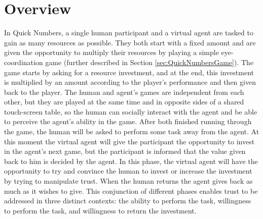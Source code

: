 \section{Overview}
\label{sec:ScenarioOverview}
In Quick Numbers, a single human participant and a virtual agent are tasked to gain as many resources as possible. They both start with a fixed amount and are given the opportunity to multiply their resources by playing a simple eye-coordination game (further described in Section \ref{sec:QuickNumbersGame}). The game starts by asking for a resource investment, and at the end, this investment is multiplied by an amount according to the player's performance and then given back to the player. The human and agent's games are independent from each other, but they are played at the same time and in opposite sides of a shared touch-screen table, so the human can socially interact with the agent and be able to perceive the agent's ability in the game. After both finished running through the game, the human will be asked to perform some task away from the agent. At this moment the virtual agent will give the participant the opportunity to invest in the agent's next game, but the participant is informed that the value given back to him is decided by the agent. In this phase, the virtual agent will have the opportunity to try and convince the human to invest or increase the investment by trying to manipulate trust. When the human returns the agent gives back as much as it wishes to give. This conjunction of different phases enables trust to be addressed in three distinct contexts: the ability to perform the task, willingness to perform the task, and willingness to return the investment.

